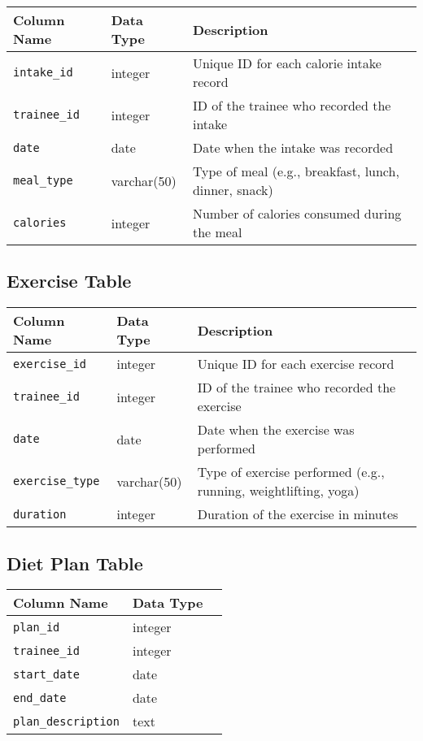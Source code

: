 \documentclass{article}
\begin{document}
\begin{tabular}{lll}
\toprule
Column Name & Data Type & Description \\
\midrule
\verb!intake_id! & integer & Unique ID for each calorie intake record \\
\verb!trainee_id! & integer & ID of the trainee who recorded the intake \\
\verb!date! & date & Date when the intake was recorded \\
\verb!meal_type! & varchar(50) & Type of meal (e.g., breakfast, lunch, dinner, snack) \\
\verb!calories! & integer & Number of calories consumed during the meal \\
\bottomrule
\end{tabular}

\subsection*{Exercise Table}

\begin{tabular}{lll}
\toprule
Column Name & Data Type & Description \\
\midrule
\verb!exercise_id! & integer & Unique ID for each exercise record \\
\verb!trainee_id! & integer & ID of the trainee who recorded the exercise \\
\verb!date! & date & Date when the exercise was performed \\
\verb!exercise_type! & varchar(50) & Type of exercise performed (e.g., running, weightlifting, yoga) \\
\verb!duration! & integer & Duration of the exercise in minutes \\
\bottomrule
\end{tabular}

\subsection*{Diet Plan Table}

\begin{tabular}{lll}
\toprule
Column Name & Data Type  \\
\midrule
\verb!plan_id! & integer \\
\verb!trainee_id! & integer  \\
\verb!start_date! & date  \\
\verb!end_date! & date  \\
\verb!plan_description! & text \\
\bottomrule
\end{tabular}
\end{document}
